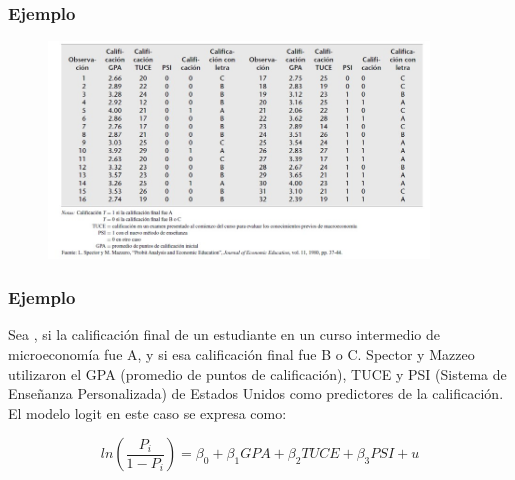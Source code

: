 \documentclass[10pt]{beamer}
\begin{document}
\begin{frame}
\frametitle{Ejemplo}

\begin{figure}
\begin{center}
    \includegraphics[width=0.9\textwidth]{9_5.JPG}
\end{center}
\end{figure}


\end{frame}




\begin{frame}
\frametitle{Ejemplo}

Sea , si la calificación final de un estudiante en un curso intermedio de microeconomía fue A, y  si esa calificación final fue B o C. Spector y Mazzeo utilizaron el GPA (promedio de puntos de calificación), TUCE y PSI (Sistema de Enseñanza Personalizada) de Estados Unidos como predictores de la calificación. El modelo logit en este caso se expresa como:

\vspace{4mm}

\begin{equation}
ln \left(  \frac{P_i}{1 - P_i} \right) = \beta_0 + \beta_1 GPA + \beta_2 TUCE + \beta_3 PSI + u
\end{equation}


\end{frame}

\end{document}
